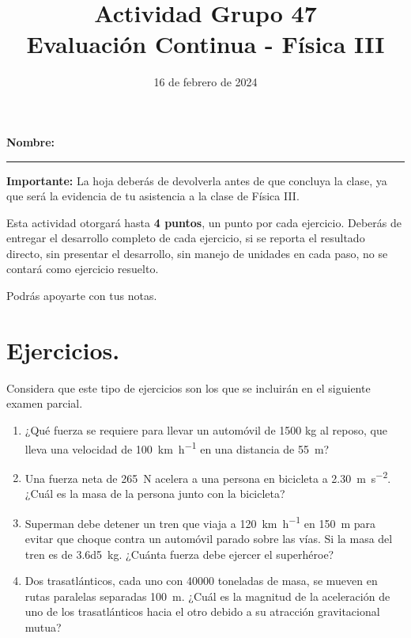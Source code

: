 \documentclass[14pt]{extarticle}
\title{\vspace*{-2cm} Actividad Grupo 47 \\  Evaluación Continua - Física III\vspace{-5ex}}
\date{16 de febrero de 2024}
\begin{document}
\maketitle

\textbf{Nombre:} \rule{8cm}{0.1mm}

\vspace*{0.75cm}
\textbf{Importante: } La hoja deberás de devolverla antes de que concluya la clase, ya que será la evidencia de tu asistencia a la clase de Física III.

\vspace*{0.5cm}
Esta actividad otorgará hasta \textbf{4 puntos}, un punto por cada ejercicio. Deberás de entregar el desarrollo completo de cada ejercicio, si se reporta el resultado directo, sin presentar el desarrollo, sin manejo de unidades en cada paso, no se contará como ejercicio resuelto.

\vspace*{0.75cm}
Podrás apoyarte con tus notas.

\section{Ejercicios.}

Considera que este tipo de ejercicios son los que se incluirán en el siguiente examen parcial.

\begin{enumerate}
\item ¿Qué fuerza se requiere para llevar un automóvil de 1500 kg al reposo, que lleva una velocidad de \SI{100}{\kilo\meter\per\hour} en una distancia de \SI{55}{\meter}?
\item Una fuerza neta de \SI{265}{\newton} acelera a una persona en bicicleta a \SI{2.30}{\meter\per\square\second}. ¿Cuál es la masa de la persona junto con la bicicleta?
\item Superman debe detener un tren que viaja a \SI{120}{\kilo\meter\per\hour} en \SI{150}{\meter} para evitar que choque contra un automóvil parado sobre las vías. Si la masa del tren es de \SI{3.6d5}{\kilo\gram}. ¿Cuánta fuerza debe ejercer el superhéroe?
\item Dos trasatlánticos, cada uno con \num{40000} toneladas de masa, se mueven en rutas paralelas separadas \SI{100}{\meter}. ¿Cuál es la magnitud de la aceleración de uno de los trasatlánticos hacia el otro debido a su atracción gravitacional mutua?
\end{enumerate}
\end{document}
